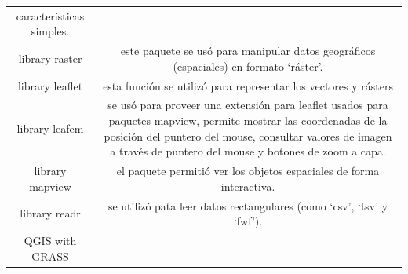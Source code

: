 \documentclass[11pt,]{article}
\begin{document}
\begin{longtable}[]{@{}cc@{}}
\begin{minipage}[t]{0.83\columnwidth}
características simples.\strut
\end{minipage}\tabularnewline
\begin{minipage}[t]{0.11\columnwidth}\centering\strut
library raster\strut
\end{minipage} & \begin{minipage}[t]{0.83\columnwidth}\centering\strut
este paquete se usó para manipular datos geográficos (espaciales) en
formato `ráster'.\strut
\end{minipage}\tabularnewline
\begin{minipage}[t]{0.11\columnwidth}\centering\strut
library leaflet\strut
\end{minipage} & \begin{minipage}[t]{0.83\columnwidth}\centering\strut
esta función se utilizó para representar los vectores y rásters\strut
\end{minipage}\tabularnewline
\begin{minipage}[t]{0.11\columnwidth}\centering\strut
library leafem\strut
\end{minipage} & \begin{minipage}[t]{0.83\columnwidth}\centering\strut
se usó para proveer una extensión para leaflet usados para paquetes
mapview, permite mostrar las coordenadas de la posición del puntero del
mouse, consultar valores de imagen a través de puntero del mouse y
botones de zoom a capa.\strut
\end{minipage}\tabularnewline
\begin{minipage}[t]{0.11\columnwidth}\centering\strut
library mapview\strut
\end{minipage} & \begin{minipage}[t]{0.83\columnwidth}\centering\strut
el paquete permitió ver los objetos espaciales de forma
interactiva.\strut
\end{minipage}\tabularnewline
\begin{minipage}[t]{0.11\columnwidth}\centering\strut
library readr\strut
\end{minipage} & \begin{minipage}[t]{0.83\columnwidth}\centering\strut
se utilizó pata leer datos rectangulares (como `csv', `tsv' y
`fwf').\strut
\end{minipage}\tabularnewline
\begin{minipage}[t]{0.11\columnwidth}\centering\strut
QGIS with GRASS\strut
\end{minipage} & \begin{minipage}[t]{0.83\columnwidth}\centering\strut

\end{minipage}
\end{longtable}
\end{document}
